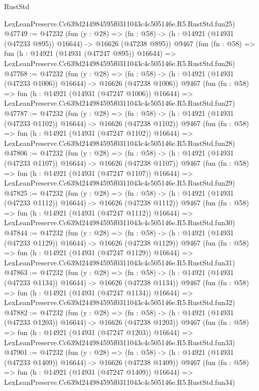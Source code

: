 \begin{lexlean}{RustStd}
\begin{coremodule}
    LexLeanPreserve.Cc639d244984595f0311043c4c505146e.R5.RustStd.fun25)
@47749 := @47232
    (fun (y : @28) =>
    (fn : @58) -> (h : @14921 (@14931 (@47233 @895)) @16644) -> @16626 (@47238 @895))
    @9467
    (fun (fn : @58) =>
    fun (h : @14921 (@14931 (@47247 @895)) @16644) =>
    LexLeanPreserve.Cc639d244984595f0311043c4c505146e.R5.RustStd.fun26)
@47768 := @47232
    (fun (y : @28) =>
    (fn : @58) -> (h : @14921 (@14931 (@47233 @1006)) @16644) -> @16626 (@47238 @1006))
    @9467
    (fun (fn : @58) =>
    fun (h : @14921 (@14931 (@47247 @1006)) @16644) =>
    LexLeanPreserve.Cc639d244984595f0311043c4c505146e.R5.RustStd.fun27)
@47787 := @47232
    (fun (y : @28) =>
    (fn : @58) -> (h : @14921 (@14931 (@47233 @1102)) @16644) -> @16626 (@47238 @1102))
    @9467
    (fun (fn : @58) =>
    fun (h : @14921 (@14931 (@47247 @1102)) @16644) =>
    LexLeanPreserve.Cc639d244984595f0311043c4c505146e.R5.RustStd.fun28)
@47806 := @47232
    (fun (y : @28) =>
    (fn : @58) -> (h : @14921 (@14931 (@47233 @1107)) @16644) -> @16626 (@47238 @1107))
    @9467
    (fun (fn : @58) =>
    fun (h : @14921 (@14931 (@47247 @1107)) @16644) =>
    LexLeanPreserve.Cc639d244984595f0311043c4c505146e.R5.RustStd.fun29)
@47825 := @47232
    (fun (y : @28) =>
    (fn : @58) -> (h : @14921 (@14931 (@47233 @1112)) @16644) -> @16626 (@47238 @1112))
    @9467
    (fun (fn : @58) =>
    fun (h : @14921 (@14931 (@47247 @1112)) @16644) =>
    LexLeanPreserve.Cc639d244984595f0311043c4c505146e.R5.RustStd.fun30)
@47844 := @47232
    (fun (y : @28) =>
    (fn : @58) -> (h : @14921 (@14931 (@47233 @1129)) @16644) -> @16626 (@47238 @1129))
    @9467
    (fun (fn : @58) =>
    fun (h : @14921 (@14931 (@47247 @1129)) @16644) =>
    LexLeanPreserve.Cc639d244984595f0311043c4c505146e.R5.RustStd.fun31)
@47863 := @47232
    (fun (y : @28) =>
    (fn : @58) -> (h : @14921 (@14931 (@47233 @1134)) @16644) -> @16626 (@47238 @1134))
    @9467
    (fun (fn : @58) =>
    fun (h : @14921 (@14931 (@47247 @1134)) @16644) =>
    LexLeanPreserve.Cc639d244984595f0311043c4c505146e.R5.RustStd.fun32)
@47882 := @47232
    (fun (y : @28) =>
    (fn : @58) -> (h : @14921 (@14931 (@47233 @1203)) @16644) -> @16626 (@47238 @1203))
    @9467
    (fun (fn : @58) =>
    fun (h : @14921 (@14931 (@47247 @1203)) @16644) =>
    LexLeanPreserve.Cc639d244984595f0311043c4c505146e.R5.RustStd.fun33)
@47901 := @47232
    (fun (y : @28) =>
    (fn : @58) -> (h : @14921 (@14931 (@47233 @1409)) @16644) -> @16626 (@47238 @1409))
    @9467
    (fun (fn : @58) =>
    fun (h : @14921 (@14931 (@47247 @1409)) @16644) =>
    LexLeanPreserve.Cc639d244984595f0311043c4c505146e.R5.RustStd.fun34)

\end{coremodule}
\end{lexlean}
